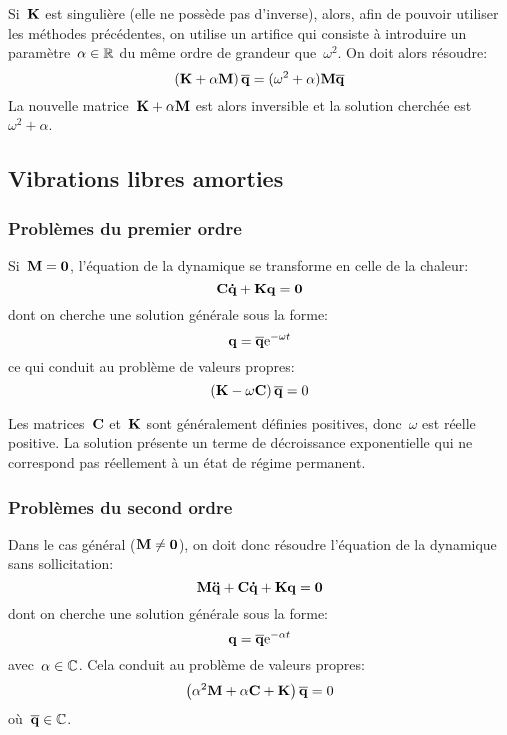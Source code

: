 Si~$\MM{K}$ est singulière (elle ne possède pas d'inverse), alors, afin de pouvoir utiliser les méthodes
précédentes, on utilise un artifice qui consiste à introduire un paramètre~$\alpha\in\mathbb R$ du
même ordre de grandeur que~$\omega^2$. On doit alors résoudre:
\begin{equation}\left(\MM{K}+\alpha \MM{M}\right)\VV{\overline{q}} = (\omega^2+\alpha)\MM{M} \VV{\overline{q}}\end{equation}
La nouvelle matrice~$\MM{K}+\alpha \MM{M}$ est alors inversible et la solution cherchée est~$\omega^2+\alpha$.

\medskip
\subsection{Vibrations libres amorties}
\subsubsection{Problèmes du premier ordre}
Si~$\MM{M}=\MM{0}$, l'équation de la dynamique se
transforme en celle de la chaleur:
\begin{equation} \MM{C}\VV{\dot{q}}+\MM{K}\VV{q}=\VV{0} \end{equation}
dont on cherche une solution générale sous la forme:
\begin{equation} \VV{q}=\VV{\overline{q}}\mathrm{e}^{-\omega t} \end{equation}
ce qui conduit au problème de valeurs propres:
\begin{equation} \left(\MM{K}-\omega\MM{C}\right)\VV{\overline{q}}=0\end{equation}

Les matrices~$\MM{C}$ et~$\MM{K}$ sont généralement définies positives, donc~$\omega$ est réelle positive. La solution présente un terme de décroissance exponentielle qui ne correspond pas réellement à un état de régime permanent.

\medskip
\subsubsection{Problèmes du second ordre}
Dans le cas général ($\MM{M}\ne\MM{0}$), on doit donc résoudre l'équation de la dynamique
sans sollicitation:
\begin{equation} \MM{M}\VV{\ddot{q}}+\MM{C}\VV{\dot{q}}+\MM{K}\VV{q}=\VV{0} \end{equation}
dont on cherche une solution générale sous la forme:
\begin{equation} \VV{q}=\VV{\overline{q}}\mathrm{e}^{-\alpha t} \end{equation}
avec~$\alpha\in\mathbb C$.
Cela conduit au problème de valeurs propres:
\begin{equation} \left(\alpha^2\MM{M}+\alpha\MM{C}+\MM{K}\right)\VV{\overline{q}}=0\end{equation}
où~$\VV{\overline{q}}\in\CC$.

